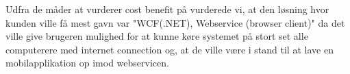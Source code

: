 Udfra de måder at vurderer cost benefit på vurderede vi, at den løsning hvor kunden ville få mest gavn var "WCF(.NET), Webservice (browser client)" da det ville give brugeren mulighed for at kunne køre systemet på stort set alle computerere med internet connection og, at de ville være i stand til at lave en mobilapplikation op imod webservicen.




 